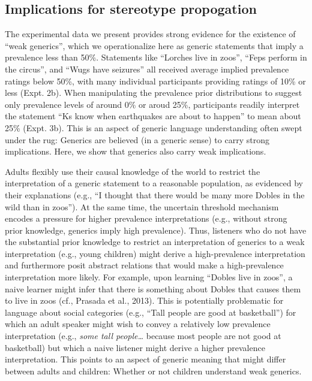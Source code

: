 \documentclass[,man,floatsintext]{apa6}
\theoremstyle{definition}
\theoremstyle{definition}
\theoremstyle{definition}
\theoremstyle{remark}
\begin{document}
\hypertarget{implications-for-stereotype-propogation}{%
\subsection{Implications for stereotype
propogation}\label{implications-for-stereotype-propogation}}

The experimental data we present provides strong evidence for the
existence of \enquote{weak generics}, which we operationalize here as
generic statements that imply a prevalence less than 50\%. Statements
like \enquote{Lorches live in zoos}, \enquote{Feps perform in the
circus}, and \enquote{Wugs have seizures} all received average implied
prevalence ratings below 50\%, with many individual participants
providing ratings of 10\% or less (Expt. 2b). When manipulating the
prevalence prior distributions to suggest only prevalence levels of
around 0\% or aroud 25\%, participants readily interpret the statement
\enquote{Ks know when earthquakes are about to happen} to mean about
25\% (Expt. 3b). This is an aspect of generic language understanding
often swept under the rug: Generics are believed (in a generic sense) to
carry strong implications. Here, we show that generics also carry weak
implications.

Adults flexibly use their causal knowledge of the world to restrict the
interpretation of a generic statement to a reasonable population, as
evidenced by their explanations (e.g., \enquote{I thought that there
would be many more Dobles in the wild than in zoos}). At the same time,
the uncertain threshold mechanism encodes a pressure for higher
prevalence interpretations (e.g., without strong prior knowledge,
generics imply high prevalence). Thus, listeners who do not have the
substantial prior knowledge to restrict an interpretation of generics to
a weak interpretation (e.g., young children) might derive a
high-prevalence interpretation and furthermore posit abstract relations
that would make a high-prevalence interpretation more likely. For
example, upon learning \enquote{Dobles live in zoos}, a naive learner
might infer that there is something about Dobles that causes them to
live in zoos (cf., Prasada et al., 2013). This is potentially
problematic for language about social categories (e.g., \enquote{Tall
people are good at basketball}) for which an adult speaker might wish to
convey a relatively low prevalence interpretation (e.g., \emph{some tall
people\ldots{}} because most people are not good at basketball) but
which a naive listener might derive a higher prevalence interpretation.
This points to an aspect of generic meaning that might differ between
adults and children: Whether or not children understand weak generics.
\end{document}
